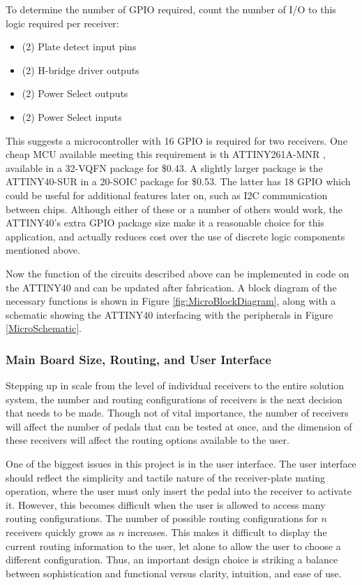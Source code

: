 \documentclass{article}
\begin{document}
		To determine the number of GPIO required, count the number of I/O to this logic required per receiver:

		\begin{itemize}
			\item (2) Plate detect input pins
			\item (2) H-bridge driver outputs
			\item (2) Power Select outputs
			\item (2) Power Select inputs
		\end{itemize}

		This suggests a microcontroller with 16 GPIO is required for two receivers.  One cheap MCU available meeting this requirement is th ATTINY261A-MNR \cite{ATTINY261Adatasheet}, available in a 32-VQFN package for \$0.43.  A slightly larger package is the ATTINY40-SUR \cite{ATTINY40datasheet} in a 20-SOIC package for \$0.53.  The latter has 18 GPIO which could be useful for additional features later on, such as I2C communication between chips.  Although either of these or a number of others would work, the ATTINY40's extra GPIO package size make it a reasonable choice for this application, and actually reduces cost over the use of discrete logic components mentioned above.

		Now the function of the circuits described above can be implemented in code on the ATTINY40 and can be updated after fabrication.  A block diagram of the necessary functions is shown in Figure \ref{fig:MicroBlockDiagram}, along with a schematic showing the ATTINY40 interfacing with the peripherals in Figure \ref{MicroSchematic}.

		\subsubsection{Main Board Size, Routing, and User Interface}
		Stepping up in scale from the level of individual receivers to the entire solution system, the number and routing configurations of receivers is the next decision that needs to be made.  Though not of vital importance, the number of receivers will affect the number of pedals that can be tested at once, and the dimension of these receivers will affect the routing options available to the user.

		One of the biggest issues in this project is in the user interface.  The user interface should reflect the simplicity and tactile nature of the receiver-plate mating operation, where the user must only insert the pedal into the receiver to activate it.  However, this becomes difficult when the user is allowed to access many routing configurations.  The number of possible routing configurations for $n$ receivers quickly grows as $n$ increases.  This makes it difficult to display the current routing information to the user, let alone to allow the user to choose a different configuration.  Thus, an important design choice is striking a balance between sophistication and functional versus clarity, intuition, and ease of use.
\end{document}
